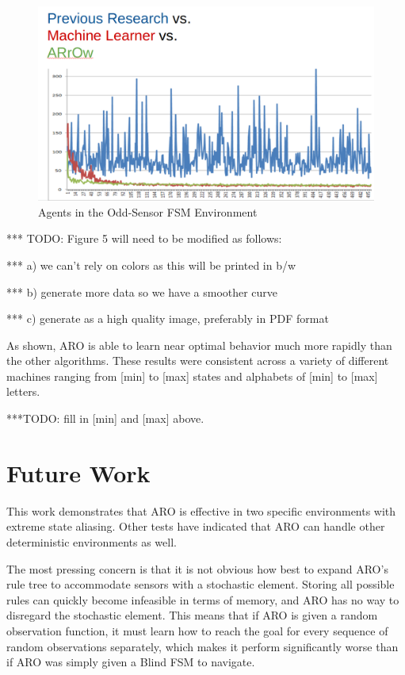 \documentclass[letterpaper]{article} %
\begin{document}
\begin{figure}[t]
  \centering
  \includegraphics[width=0.9\columnwidth]{OSFSMResult.png} %
  \caption{Agents in the Odd-Sensor FSM Environment}
  \label{fig5}
\end{figure}

*** TODO: Figure 5 will need to be modified as follows:

***    a) we can't rely on colors as this will be printed in b/w

***    b) generate more data so we have a smoother curve

***    c) generate as a high quality image, preferably in PDF format


As shown, ARO is able to learn near optimal behavior much more rapidly
than the other algorithms.  These results were consistent across a
variety of different machines ranging from [min] to [max] states and
alphabets of [min] to [max] letters.

***TODO:  fill in [min] and [max] above.

\section{Future Work}

This work demonstrates that ARO is effective in two specific
environments with extreme state aliasing. Other tests have indicated that ARO can handle other deterministic environments as well.

The most pressing concern is that it is not obvious how best to expand
ARO's rule tree to accommodate sensors with a stochastic element. Storing all possible rules can quickly become infeasible in terms of memory, and ARO has no way to disregard the stochastic element. This means that if ARO is given a random observation function, it must learn how to reach the goal for every sequence of random observations separately, which makes it perform significantly worse than if ARO was simply given a Blind FSM to navigate. 
\end{document}
